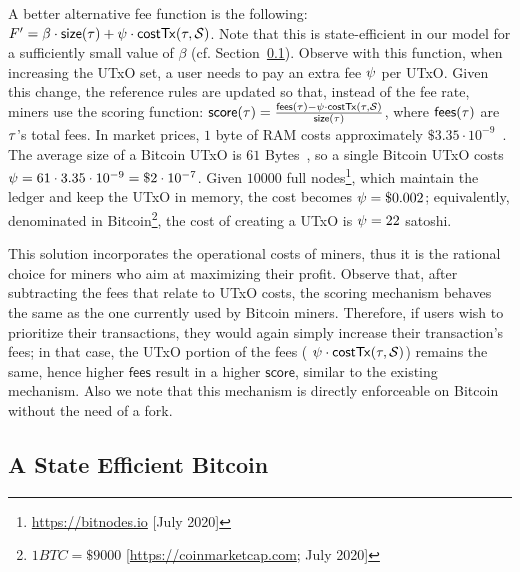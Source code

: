 A better alternative fee function is the following:
$F' = \beta \cdot
\mathsf{size}(\tau) + \psi \cdot \mathsf{costTx}(\tau, \mathcal{S})$.
Note that this is state-efficient in our model  for a
sufficiently small value of $\beta$ (cf. Section~\ref{sec:state-efficient-bitcoin}).
Observe with this function, when
increasing the UTxO set, a user needs to pay an extra fee $\psi$ per UTxO.
Given this change, the reference rules are updated so that, instead of the fee rate, miners use the scoring function:
$\mathsf{score}(\tau) = \frac{\mathsf{fees}(\tau) - \psi \cdot \mathsf{costTx}(\tau,
\mathcal{S})}{\mathsf{size}(\tau)}$, where $\mathsf{fees}(\tau)$ are $\tau$'s
total fees. In market prices, $1$ byte of RAM
costs approximately $\$3.35 \cdot 10^{-9}$~\cite{ram-price}. The average size of a Bitcoin
UTxO is $61$ Bytes~\cite{FCW:DPNH18}, so a single Bitcoin UTxO costs
$\psi = 61 \cdot 3.35 \cdot 10^{-9} = \$2 \cdot 10^{-7}$. Given $10000$
full nodes\footnote{\url{https://bitnodes.io} [July 2020]}, which maintain the
ledger and keep the UTxO in memory, the cost becomes $\psi =
\$0.002$; equivalently, denominated in Bitcoin\footnote{$1 BTC = \$9000$
[\url{https://coinmarketcap.com}; July 2020]}, the cost of creating a UTxO is
$\psi = 22$ satoshi.

This solution incorporates the operational costs of miners, thus it is the
rational choice for miners who aim at maximizing their profit. Observe that,
after subtracting the fees that relate to UTxO costs, the scoring mechanism
behaves the same as the one currently used by Bitcoin miners. Therefore, if
users wish to prioritize their transactions, they would again simply increase
their transaction's fees; in that case, the UTxO portion of the fees (\ie
$\psi \cdot \mathsf{costTx}(\tau, \mathcal{S})$) remains the same, hence higher
$\mathsf{fees}$ result in a higher $\mathsf{score}$, similar to the existing
mechanism. Also we note that this mechanism is directly enforceable on Bitcoin
without the need of a fork.

\subsection{A State Efficient Bitcoin}\label{sec:state-efficient-bitcoin}

